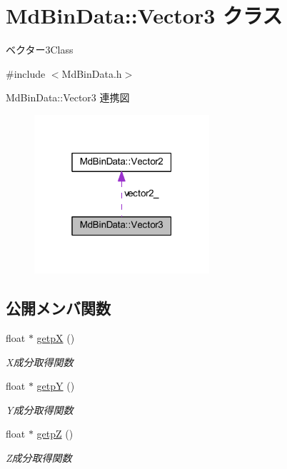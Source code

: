 \hypertarget{class_md_bin_data_1_1_vector3}{}\section{Md\+Bin\+Data\+:\+:Vector3 クラス}
\label{class_md_bin_data_1_1_vector3}


ベクター3\+Class  




{\ttfamily \#include $<$Md\+Bin\+Data.\+h$>$}



Md\+Bin\+Data\+:\+:Vector3 連携図\nopagebreak
\begin{figure}[H]
\begin{center}
\leavevmode
\includegraphics[width=184pt]{class_md_bin_data_1_1_vector3__coll__graph}
\end{center}
\end{figure}
\subsection*{公開メンバ関数}
\begin{DoxyCompactItemize}
\item 
float $\ast$ \mbox{\hyperlink{class_md_bin_data_1_1_vector3_a92662563dc33035c94d457cd96d7972e}{getpX}} ()
\begin{DoxyCompactList}\small\item\em X成分取得関数 \end{DoxyCompactList}\item 
float $\ast$ \mbox{\hyperlink{class_md_bin_data_1_1_vector3_aaf3534a3038219e74875d002255e0c27}{getpY}} ()
\begin{DoxyCompactList}\small\item\em Y成分取得関数 \end{DoxyCompactList}\item 
float $\ast$ \mbox{\hyperlink{class_md_bin_data_1_1_vector3_a3f0b7ef217f5a065fa86aa3da983b6a4}{getpZ}} ()
\begin{DoxyCompactList}\small\item\em Z成分取得関数 \end{DoxyCompactList}\end{DoxyCompactItemize}
